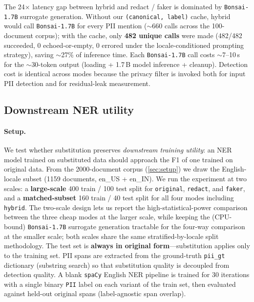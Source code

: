 \documentclass[11pt]{article}
\newcommand{\code}[1]{\texttt{#1}}
\newcommand{\bonsai}{\code{Bonsai-1.7B}}
\newcommand{\spacy}{\code{spaCy}}
\begin{document}
The 24$\times$ latency gap between hybrid and redact / faker is
dominated by \bonsai{} surrogate generation. Without our
\code{(canonical, label)} cache, hybrid would call \bonsai{} for every
PII mention ($\sim$660 calls across the 100-document corpus); with the
cache, only \textbf{482 unique calls} were made (482/482 succeeded,
0 echoed-or-empty, 0 errored under the locale-conditioned prompting
strategy), saving $\sim$27\% of inference time. Each \bonsai{} call
costs $\sim$7--10\,s for the $\sim$30-token output (loading + 1.7\,B
model inference + cleanup). Detection cost is identical across modes
because the privacy filter is invoked both for input PII detection and
for residual-leak measurement.

\subsection{Downstream NER utility}
\label{sec:ner}

\paragraph{Setup.}
We test whether substitution preserves \emph{downstream training
utility}: an NER model trained on substituted data should approach the
F1 of one trained on original data. From the 2000-document corpus
(\cref{sec:setup}) we draw the English-locale subset (1159 documents,
en\_US + en\_IN). We run the experiment at two scales: a
\textbf{large-scale} 400 train / 100 test split for \code{original},
\code{redact}, and \code{faker}, and a \textbf{matched-subset} 160
train / 40 test split for all four modes including \code{hybrid}.
The two-scale design lets us report the high-statistical-power
comparison between the three cheap modes at the larger scale, while
keeping the (CPU-bound) \bonsai{} surrogate generation tractable for
the four-way comparison at the smaller scale; both scales share the
same stratified-by-locale split methodology. The test set is
\textbf{always in original form}---substitution applies only to the
training set. PII spans are extracted from the ground-truth
\code{pii\_gt} dictionary (substring search) so that substitution
quality is decoupled from detection quality. A blank \spacy{} English
NER pipeline is trained for 30 iterations with a single binary
\code{PII} label on each variant of the train set, then evaluated
against held-out original spans (label-agnostic span overlap).
\end{document}

